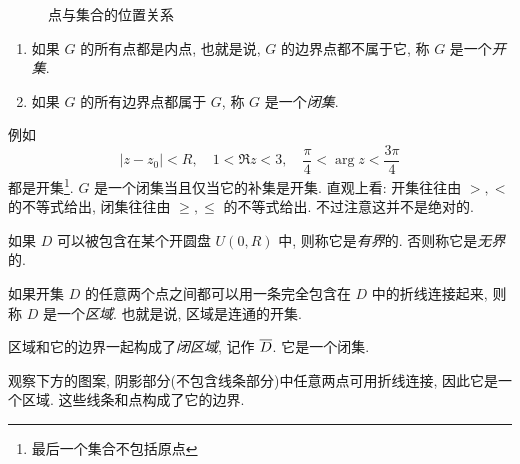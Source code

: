 \begin{figure}
  \centering
  \caption{点与集合的位置关系}
\end{figure}

\begin{definition}[开集和闭集]
  \begin{enumerate}
    \item 如果 $G$ 的所有点都是内点, 也就是说, $G$ 的边界点都不属于它, 称 $G$ 是一个\emph{开集}.
    \item 如果 $G$ 的所有边界点都属于 $G$, 称 $G$ 是一个\emph{闭集}.
  \end{enumerate}
\end{definition}
例如
  \[|z-z_0|<R,\quad 1<\Re z<3,\quad\frac\pi4<\arg z<\dfrac{3\pi}4\]
都是开集\footnote{最后一个集合不包括原点}.
$G$ 是一个闭集当且仅当它的补集是开集.
直观上看: 开集往往由 $>,<$ 的不等式给出, 闭集往往由 $\ge,\le$ 的不等式给出.
不过注意这并不是绝对的.

如果 $D$ 可以被包含在某个开圆盘 $U(0,R)$ 中, 则称它是\emph{有界}的.
否则称它是\emph{无界}的.

\begin{definition}[区域]
  如果开集 $D$ 的任意两个点之间都可以用一条完全包含在 $D$ 中的折线连接起来, 则称 $D$ 是一个\emph{区域}.
  也就是说, 区域是连通的开集.
\end{definition}
区域和它的边界一起构成了\emph{闭区域}, 记作 $\overline D$.
它是一个闭集.

观察下方的图案, 阴影部分(不包含线条部分)中任意两点可用折线连接, 因此它是一个区域.
这些线条和点构成了它的边界.

